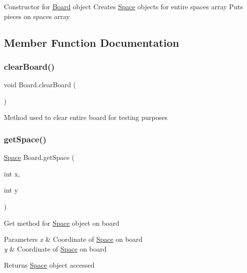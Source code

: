 Constructor for \mbox{\hyperlink{class_board}{Board}} object Creates \mbox{\hyperlink{class_space}{Space}} objects for entire spaces array Puts pieces on spaces array 

\subsection{Member Function Documentation}
\mbox{\label{class_board_ab44e7c91927bdfd4f07852c0cc48e1b8}} 
\subsubsection{\texorpdfstring{clearBoard()}{clearBoard()}}
{\footnotesize\ttfamily void Board.\+clear\+Board (\begin{DoxyParamCaption}{ }\end{DoxyParamCaption})\hspace{0.3cm}{\ttfamily [inline]}}

Method used to clear entire board for testing purposes \mbox{\label{class_board_a84de355cd8a8b969a6f931f77914c7d3}} 
\subsubsection{\texorpdfstring{getSpace()}{getSpace()}}
{\footnotesize\ttfamily \mbox{\hyperlink{class_space}{Space}} Board.\+get\+Space (\begin{DoxyParamCaption}\item[{int}]{x,  }\item[{int}]{y }\end{DoxyParamCaption})\hspace{0.3cm}{\ttfamily [inline]}}

Get method for \mbox{\hyperlink{class_space}{Space}} object on board 
\begin{DoxyParams}{Parameters}
{\em x} & Coordinate of \mbox{\hyperlink{class_space}{Space}} on board \\
\hline
{\em y} & Coordinate of \mbox{\hyperlink{class_space}{Space}} on board \\
\hline
\end{DoxyParams}
\begin{DoxyReturn}{Returns}
\mbox{\hyperlink{class_space}{Space}} object accessed 
\end{DoxyReturn}
\mbox{\label{class_board_a75f6d9258dc139f36c39075f3fe8491d}} 
